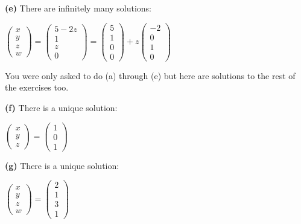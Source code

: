 \documentclass[oneside,12pt]{amsart}
\begin{document}
\bigskip

\textbf{(e)}  There are infinitely many solutions:

\bigskip

$
\begin{pmatrix}
x \\  y \\z \\ w
\end{pmatrix}
=
\begin{pmatrix}
5-2z \\
1 \\
z \\
0
\end{pmatrix}
=
\begin{pmatrix}
5\\
1 \\
0 \\
0
\end{pmatrix}
+
z
\begin{pmatrix}
-2 \\
0 \\
1 \\
0
\end{pmatrix}
$


\bigskip

You were only asked to do (a) through (e) but here are solutions to the
rest of the exercises too.

\bigskip

\textbf{(f)} There is a unique solution:

\bigskip

$
\begin{pmatrix}
x \\  y \\ z
\end{pmatrix}
=
\begin{pmatrix}
1 \\
0 \\
1
\end{pmatrix}
$

\bigskip

\textbf{(g)} There is a unique solution:

\bigskip

$
\begin{pmatrix}
x \\  y \\ z \\ w
\end{pmatrix}
=
\begin{pmatrix}
2 \\
1 \\
3 \\
1
\end{pmatrix}
$
\end{document}
